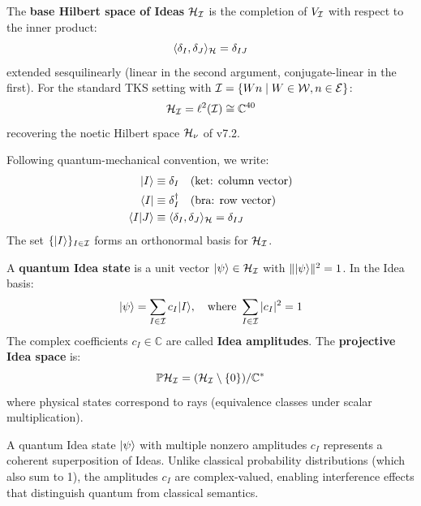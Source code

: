 \begin{definition}
\label{def:base-hilbert-ideas}
The \textbf{base Hilbert space of Ideas} $\mathcal{H}_{\mathcal{I}}$ is the completion of $V_{\mathcal{I}}$ with respect to the inner product:
\[
\langle \delta_I, \delta_J \rangle_{\mathcal{H}} = \delta_{IJ}
\]
extended sesquilinearly (linear in the second argument, conjugate-linear in the first). For the standard TKS setting with $\mathcal{I} = \{Wn \mid W \in \mathcal{W}, n \in \mathcal{E}\}$:
\[
\mathcal{H}_{\mathcal{I}} = \ell^2(\mathcal{I}) \cong \mathbb{C}^{40}
\]
recovering the noetic Hilbert space $\mathcal{H}_\nu$ of v7.2.
\end{definition}

\begin{notation}
\label{not:dirac}
Following quantum-mechanical convention, we write:
\begin{align}
|I\rangle &\equiv \delta_I \quad \text{(ket: column vector)} \\
\langle I| &\equiv \delta_I^\dagger \quad \text{(bra: row vector)} \\
\langle I | J \rangle &\equiv \langle \delta_I, \delta_J \rangle_{\mathcal{H}} = \delta_{IJ}
\end{align}
The set $\{|I\rangle\}_{I \in \mathcal{I}}$ forms an orthonormal basis for $\mathcal{H}_{\mathcal{I}}$.
\end{notation}

\begin{definition}
\label{def:quantum-idea-state}
A \textbf{quantum Idea state} is a unit vector $|\psi\rangle \in \mathcal{H}_{\mathcal{I}}$ with $\||\psi\rangle\|^2 = 1$. In the Idea basis:
\[
|\psi\rangle = \sum_{I \in \mathcal{I}} c_I |I\rangle, \quad \text{where } \sum_{I \in \mathcal{I}} |c_I|^2 = 1
\]
The complex coefficients $c_I \in \mathbb{C}$ are called \textbf{Idea amplitudes}. The \textbf{projective Idea space} is:
\[
\mathbb{P}\mathcal{H}_{\mathcal{I}} = (\mathcal{H}_{\mathcal{I}} \setminus \{0\}) / \mathbb{C}^*
\]
where physical states correspond to rays (equivalence classes under scalar multiplication).
\end{definition}

\begin{remark}
\label{rem:superposition}
A quantum Idea state $|\psi\rangle$ with multiple nonzero amplitudes $c_I$ represents a coherent superposition of Ideas. Unlike classical probability distributions (which also sum to 1), the amplitudes $c_I$ are complex-valued, enabling interference effects that distinguish quantum from classical semantics.
\end{remark}

